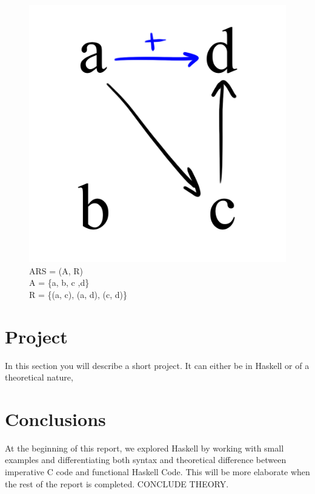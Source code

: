 \documentclass{article}
\begin{document}
{\begin{figure}[h!]
  \centering
  \includegraphics[scale=0.06]{v5}
  \caption[] {
     ARS = (A, R) \\ A = \{a, b, c ,d\} \\ R = \{(a, c), (a, d), (c, d)\}
    \endtabular}
\end{figure}

\medskip\noindent

\medskip\noindent

\medskip\noindent

\section{Project}

In this section you will describe a short project. It can either be in Haskell or of a theoretical nature,

\section{Conclusions}\label{conclusions}
At the beginning of this report, we explored Haskell by working with small examples and differentiating both syntax and theoretical difference between imperative C code and functional Haskell Code. This will be more elaborate when the rest of the report is completed. CONCLUDE THEORY.

}
\end{document}
